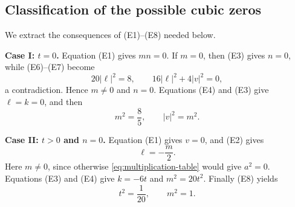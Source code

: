 \documentclass[11pt,reqno]{amsart}
\theoremstyle{definition}
\theoremstyle{remark}
\newcommand{\abs}[1]{\left\lvert #1\right\rvert}
\begin{document}
\subsection{Classification of the possible cubic zeros}

We extract the consequences of (E1)--(E8) needed below.

\medskip
\noindent\textbf{Case I: $t=0$.}
Equation (E1) gives $mn=0$.  If $m=0$, then (E3) gives $n=0$, while
(E6)--(E7) become
\[
20\abs\ell^2=8,
\qquad
16\abs\ell^2+4\abs v^2=0,
\]
a contradiction.  Hence $m\ne0$ and $n=0$.  Equations (E4) and (E3) give
$\ell=k=0$, and then
\begin{equation}\label{eq:case-I}
m^2=\frac85,
\qquad
\abs v^2=m^2.
\end{equation}

\medskip
\noindent\textbf{Case II: $t>0$ and $n=0$.}
Equation (E1) gives $v=0$, and (E2) gives
\begin{equation}\label{eq:case-II-ell}
\ell=-\frac m2.
\end{equation}
Here $m\ne0$, since otherwise \eqref{eq:multiplication-table} would give
$a^2=0$.  Equations (E3) and (E4) give
$k=-6t$ and $m^2=20t^2$.  Finally (E8) yields
\begin{equation}\label{eq:case-II}
t^2=\frac1{20},
\qquad
m^2=1.
\end{equation}
\end{document}
